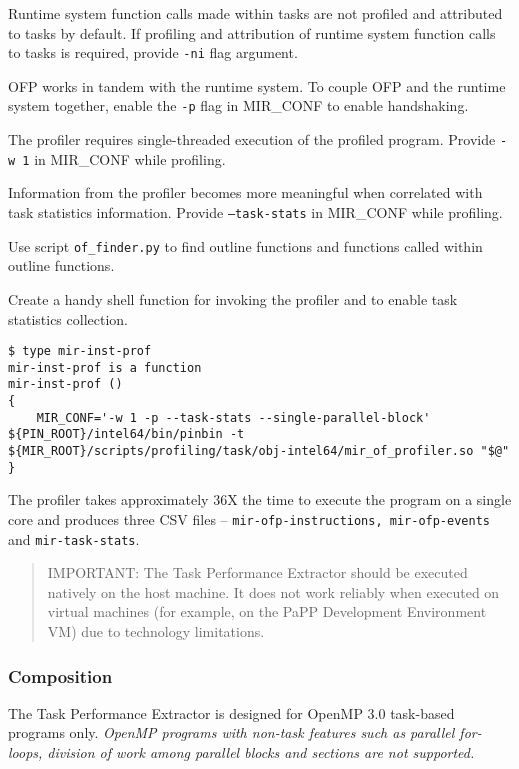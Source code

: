 \documentclass[11pt,a4paper]{article}
\begin{document}
Runtime system function calls made within tasks are not profiled and attributed to tasks by default.
If profiling and attribution of runtime system function calls to tasks is required, provide \texttt{-ni} flag argument.

OFP works in tandem with the runtime system. To couple OFP and the runtime system together, enable the \texttt{-p} flag in MIR\_CONF to enable handshaking.

The profiler requires single-threaded execution of the profiled program. Provide \texttt{-w 1} in MIR\_CONF while profiling.

Information from the profiler becomes more meaningful when correlated with task statistics information. Provide \texttt{--task-stats} in MIR\_CONF while profiling.

Use script \texttt{of\_finder.py} to find outline functions and functions called within outline functions.

Create a handy shell function for invoking the profiler and to enable task statistics collection.

\begin{lstlisting}[style=MyInputStyle]
$ type mir-inst-prof 
mir-inst-prof is a function
mir-inst-prof () 
{ 
    MIR_CONF='-w 1 -p --task-stats --single-parallel-block' ${PIN_ROOT}/intel64/bin/pinbin -t ${MIR_ROOT}/scripts/profiling/task/obj-intel64/mir_of_profiler.so "$@"
}
\end{lstlisting}

The profiler takes approximately 36X  the time to execute the program on a single core and produces three CSV files -- \texttt{mir-ofp-instructions, mir-ofp-events} and \texttt{mir-task-stats}.

\begin{framed}
\begin{quote}
IMPORTANT: The Task Performance Extractor should be executed natively on the host machine. It does not work reliably when executed on virtual machines (for example, on the PaPP Development Environment VM) due to technology limitations.
\end{quote}
\end{framed}

\subsubsection{Composition}

The Task Performance Extractor is designed for OpenMP 3.0 task-based programs only. \emph{OpenMP programs with non-task features such as parallel for-loops, division of work among parallel blocks and sections are not supported.}
\end{document}
